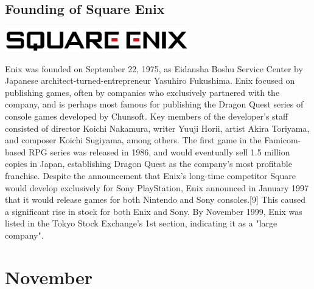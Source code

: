 \documentclass[11pt]{report}
\begin{document}
\subsection{Founding of Square Enix}
\vspace{2mm}\begin{center}\includegraphics[width=8cm]{./img/squareEnixLogo.jpg}\end{center}
Enix was founded on September 22, 1975, as Eidansha Boshu Service Center by Japanese architect-turned-entrepreneur Yasuhiro Fukushima. Enix focused on publishing games, often by companies who exclusively partnered with the company, and is perhaps most famous for publishing the Dragon Quest series of console games developed by Chunsoft. Key members of the developer's staff consisted of director Koichi Nakamura, writer Yuuji Horii, artist Akira Toriyama, and composer Koichi Sugiyama, among others. The first game in the Famicom-based RPG series was released in 1986, and would eventually sell 1.5 million copies in Japan, establishing Dragon Quest as the company's most profitable franchise. Despite the announcement that Enix's long-time competitor Square would develop exclusively for Sony PlayStation, Enix announced in January 1997 that it would release games for both Nintendo and Sony consoles.[9] This caused a significant rise in stock for both Enix and Sony. By November 1999, Enix was listed in the Tokyo Stock Exchange's 1st section, indicating it as a "large company".
\section{November}
\end{document}
